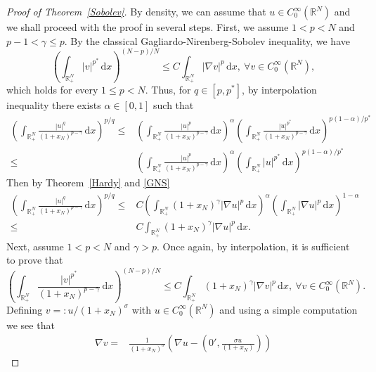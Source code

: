 \documentclass[12pt,reqno]{amsart}
\begin{document}
	\begin{proof}[Proof of Theorem~\ref{Sobolev}] By density, we can assume that $u\in C^\infty_0(\mathds{R}^N)$ and we shall proceed with the proof in several steps.  First, we assume $1<p<N$ and $p-1<\gamma\leq p$. By the classical Gagliardo-Nirenberg-Sobolev inequality, we have
 \begin{equation}\label{GNS}
			\left(\int_{\mathds{R}^N_+}|v|^{p^*}\, \mathrm{d} x\right)^{(N-p)/N}\leq C\int_{\mathds{R}^N_+}|\nabla v|^p\, \mathrm{d} x,~\forall v \in C^{\infty}_0(\mathds{R}^N),
		\end{equation}
  which holds for every $1\leq p<N$. Thus, for $q\in[p,p^*]$, by interpolation inequality there exists $\alpha\in[0,1]$ such that 	
		$$
		\begin{aligned}
	\left(\int_{\mathds{R}^N_+}\frac{|u|^q}{(1+x_N)^{p-\gamma}}\, \mathrm{d} x\right)^{p/q} \leq&\left(\int_{\mathds{R}^N_+} \frac{|u|^p}{(1+x_N)^{p-\gamma}}\, \mathrm{d} x\right)^{\alpha}
\left(\int_{\mathds{R}^N_+} \frac{|u|^{p^*}}{(1+x_N)^{p-\gamma}}\, \mathrm{d} x\right)^{p(1-\alpha)/p^*}\\
			\leq& \left(\int_{\mathds{R}^N_+} \frac{|u|^p}{(1+x_N)^{p-\gamma}}\, \mathrm{d} x\right)^{\alpha}\left(\int_{\mathds{R}^N_+} |u|^{p^*}\, \mathrm{d} x\right)^{p(1-\alpha)/p^*}
   \end{aligned}
   $$
Then by Theorem~\ref{Hardy} and \eqref{GNS}
   $$
   \begin{aligned}
		\left(\int_{\mathds{R}^N_+}\frac{|u|^q}{(1+x_N)^{p-\gamma}}\, \mathrm{d} x\right)^{p/q} 	\leq& C\left(\int_{\mathds{R}^N_+} (1+x_N)^{\gamma}|\nabla u|^p\, \mathrm{d} x\right)^{\alpha}\left(\int_{\mathds{R}^N_+} |\nabla u|^p\, \mathrm{d} x\right)^{1-\alpha}\\
			\leq& C \int_{\mathds{R}^N_+} (1+x_N)^{\gamma}|\nabla u|^p\, \mathrm{d} x.
		\end{aligned}
		$$
		Next, assume $1<p<N$ and $\gamma>p$. Once again, by interpolation, it is sufficient to prove that 
		\begin{equation}\label{p^* inequality}
			\left(\int_{\mathds{R}^N_+}\frac{|v|^{p^*}}{(1+x_N)^{p-\gamma}}\, \mathrm{d} x\right)^{(N-p)/N}\leq C\int_{\mathds{R}^N_+}(1+x_N)^{\gamma}|\nabla v|^p\, \mathrm{d} x,~\forall v \in C^{\infty}_0(\mathds{R}^N).
		\end{equation}
Defining  $v=:u/(1+x_N)^\sigma$ with $u \in C^{\infty}_0(\mathds{R}^N)$ and using a simple computation we see that 
		\begin{align*}
			\nabla v=&\frac{1}{(1+x_N)^\sigma} \left(\nabla u-(0',\frac{\sigma u}{(1+x_N)})\right)

\end{align*}
\end{proof}
\end{document}
